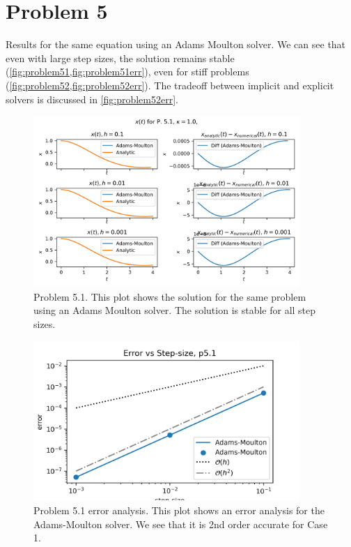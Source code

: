 \documentclass[10pt,letterpaper,notitlepage]{article}
\begin{document}
    \section{Problem 5}
    \label{sec:problem5}
    Results for the same equation using an Adams Moulton solver. We can see that even with large step sizes, the solution remains stable (\cref{fig:problem51,fig:problem51err}), even for stiff problems (\cref{fig:problem52,fig:problem52err}). The tradeoff between implicit and explicit solvers is discussed in \cref{fig:problem52err}.
    \begin{figure}[h]
        \centering
        \includegraphics[width=0.9\textwidth]{../figures/p51.png}
        \caption{Problem 5.1. This plot shows the solution for the same problem using an Adams Moulton solver. The solution is stable for all step sizes.}
        \label{fig:problem51}
    \end{figure}
    \begin{figure}[h]
        \centering
        \includegraphics[width=0.9\textwidth]{../figures/p51err.png}
        \caption{Problem 5.1 error analysis. This plot shows an error analysis for the Adams-Moulton solver. We see that it is 2nd order accurate for Case 1.}
        \label{fig:problem51err}
    \end{figure}
\end{document}
